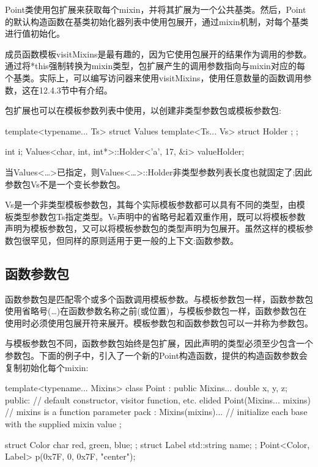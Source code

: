 Point类使用包扩展来获取每个mixin，并将其扩展为一个公共基类。然后，Point的默认构造函数在基类初始化器列表中使用包展开，通过mixin机制，对每个基类进行值初始化。

成员函数模板visitMixins是最有趣的，因为它使用包展开的结果作为调用的参数。通过将*this强制转换为mixin类型，包扩展产生的调用参数指向与mixin对应的每个基类。实际上，可以编写访问器来使用visitMixins，使用任意数量的函数调用参数，这在12.4.3节中有介绍。

包扩展也可以在模板参数列表中使用，以创建非类型参数包或模板参数包:

\begin{cpp}
template<typename... Ts>
struct Values {
	template<Ts... Vs>
	struct Holder {
	};
};

int i;
Values<char, int, int*>::Holder<'a', 17, &i> valueHolder;
\end{cpp}

当Values<…>已指定，则Values<…>::Holder非类型参数列表长度也就固定了;因此参数包Vs不是一个变长参数包。

Vs是一个非类型模板参数包，其每个实际模板参数都可以具有不同的类型，由模板类型参数包Ts指定类型。Vs声明中的省略号起着双重作用，既可以将模板参数声明为模板参数包，又可以将模板参数包的类型声明为包展开。虽然这样的模板参数包很罕见，但同样的原则适用于更一般的上下文:函数参数。

\subsection{函数参数包}

函数参数包是匹配零个或多个函数调用模板参数。与模板参数包一样，函数参数包使用省略号(…)在函数参数名称之前(或位置)，与模板参数包一样，函数参数包在使用时必须使用包展开符来展开。模板参数包和函数参数包可以一并称为参数包。

与模板参数包不同，函数参数包始终是包扩展，因此声明的类型必须至少包含一个参数包。下面的例子中，引入了一个新的Point构造函数，提供的构造函数参数会复制初始化每个mixin:

\begin{cpp}
template<typename... Mixins>
class Point : public Mixins...
{
	double x, y, z;
public:
	// default constructor, visitor function, etc. elided
	Point(Mixins... mixins) // mixins is a function parameter pack
		: Mixins(mixins)... { } // initialize each base with the supplied mixin value
};

struct Color { char red, green, blue; };
struct Label { std::string name; };
Point<Color, Label> p({0x7F, 0, 0x7F}, {"center"});
\end{cpp}

